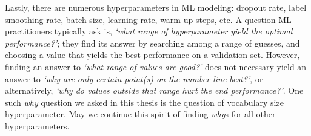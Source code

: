 Lastly, there are numerous hyperparameters in ML modeling: dropout rate, label smoothing rate, batch size, learning rate, warm-up steps, etc.
A question ML practitioners typically ask is, \textit{`what range of hyperparameter yield the optimal performance?'}; they find its answer by searching among a range of guesses, and choosing a value that yields the best performance on a validation set.
However, finding an answer to \textit{`what range of values are good?'} does not necessary yield an answer to \textit{`why are only certain point(s) on the number line best?'}, or alternatively, \textit{`why do values outside that range hurt the end performance?'}.
One such \textit{why} question we asked in this thesis is the question of vocabulary size hyperparameter. 
May we continue this spirit of finding \textit{why}s for all other hyperparameters. 


